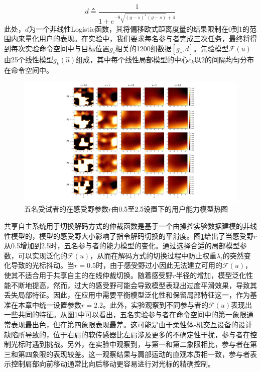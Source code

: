\begin{equation}
    \label{ex12}
    d \triangleq \frac{1}{1+e^{-8\sqrt{(g-s)^T(g-s)}+4}} 
\end{equation}    
此处，$d$为一个非线性Logistic函数，其将偏移欧式距离度量的结果限制在0到1的范围内来量化用户的表现。在实验中，我们要求每名参与者完成三次任务，最终将得到每次实验命令空间中与目标位置$g_c$相关的1200组数据$[g_c,d]$。先验模型$\mathcal{F}(u)$由25个线性模型$g_k(\hat u)$组成，其中每个线性局部模型的中心$c_k$以2的间隔均匀分布在命令空间中。
\begin{figure}[htb]
    \includegraphics[width=1\textwidth]{figures/3-Fig-9.pdf}
    \caption{五名受试者的在感受野参数$r$由0.5至2.5设置下的用户能力模型热图}
    \label{fig:3-9}
\end{figure}  

共享自主系统用于切换解码方式的仲裁函数是基于一个由操控实验数据建模的非线性模型的，模型的感受野大小影响了指令解码切换的平滑度。图\ref{fig:3-9}给出了当感受野$r$从0.5增加到2.5时，五名参与者的能力模型的变化。通过选择合适的局部模型参数，可以实现泛化的$\mathcal{F}(u)$，从而在解码方式的切换过程中防止权重$\lambda_t$的突然变化导致的光标抖动。当$r=0.5$时，由于感受野过小因此无法建立可用的$\mathcal{F}(u)$，使其不适合用于共享自主的在线仲裁切换。随着感受野$r$半径的增加，模型泛化性能不断地提高，然而，过大的感受野可能会导致模型表现出过度平滑效果，导致其丢失局部特征。因此，在应用中需要平衡模型泛化性和保留局部特征这一，作为基准在本章中统一设置参数$r=2.2$。此外，实验观察到不同参与者的$\mathcal{F}(u)$表现出一些共同的特征。从图\ref{fig:3-9}中可以看出，五名实验参与者在命令空间中的第一象限通常表现最出色，但在第四象限表现最差。这可能是由于柔性体-机交互设备的设计缺陷所导致的，位于右肩的软传感器比左肩涉及更多的不确定性干扰，参与者在控制光标时遇到挑战。另外，在实验中观察到，与第一和第二象限相比，参与者在第三和第四象限的表现较差。这一观察结果与肩部运动的直观本质相一致，参与者表示控制肩部向前移动通常比向后移动更容易进行对光标的精确控制。  


